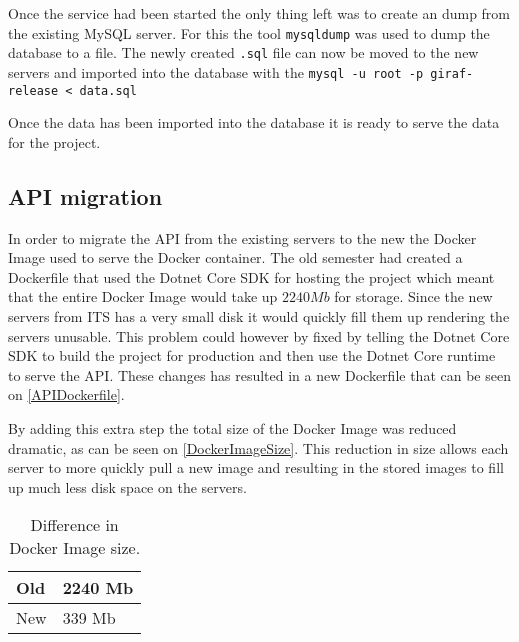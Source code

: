 Once the service had been started the only thing left was to create an dump from the existing MySQL server. 
For this the tool \lstinline$mysqldump$ was used to dump the database to a file. 
The newly created \lstinline$.sql$ file can now be moved to the new servers and imported into the database with the \lstinline$mysql -u root -p giraf-release < data.sql$

Once the data has been imported into the database it is ready to serve the data for the project.

\subsection{API migration}
In order to migrate the API from the existing servers to the new the Docker Image used to serve the Docker container.
The old semester had created a Dockerfile that used the Dotnet Core SDK for hosting the project which meant that the entire Docker Image would take up $2240 Mb$ for storage. 
Since the new servers from ITS has a very small disk it would quickly fill them up rendering the servers unusable.
This problem could however by fixed by telling the Dotnet Core SDK to build the project for production and then use the Dotnet Core runtime to serve the API. 
These changes has resulted in a new Dockerfile that can be seen on \autoref{APIDockerfile}. 

By adding this extra step the total size of the Docker Image was reduced dramatic, as can be seen on \autoref{DockerImageSize}. 
This reduction in size allows each server to more quickly pull a new image and resulting in the stored images to fill up much less disk space on the servers.

\begin{table}[H]
\centering
\begin{tabular}{|l|l|}
\hline
Old & 2240 Mb \\ \hline
New &  339 Mb  \\ \hline
\end{tabular}
\caption{Difference in Docker Image size.}
\label{DockerImageSize}
\end{table}


